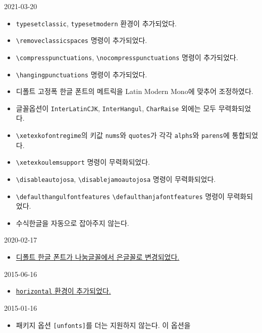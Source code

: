 \documentclass[a4paper]{article}
\def\cs#1{\texttt{\textbackslash #1}}
\begin{document}
\begin{small}\linespread{1.2}\selectfont
\begin{description}\itemsep=0pt
    \item[v3.0] 2021-03-20
      \begin{itemize}
        \item \verb|typesetclassic|, \verb|typesetmodern| 환경이 추가되었다.
        \item \cs{removeclassicspaces} 명령이 추가되었다.
        \item \cs{compresspunctuations}, \cs{nocompresspunctuations} 명령이 추가되었다.
        \item \cs{hangingpunctuations} 명령이 추가되었다.
        \item 디폴트 고정폭 한글 폰트의 메트릭을 Latin Modern Mono에
          맞추어 조정하였다.
        \item 글꼴옵션이 \verb|InterLatinCJK|, \verb|InterHangul|, \verb|CharRaise|
          외에는 모두 무력화되었다.
        \item \cs{xetexkofontregime}의 키값 \verb|nums|와 \verb|quotes|가
          각각 \verb|alphs|와 \verb|parens|에 통합되었다.
        \item \cs{xetexkoulemsupport} 명령이 무력화되었다.
        \item \cs{disableautojosa}, \cs{disablejamoautojosa} 명령이 무력화되었다.
        \item \cs{defaulthangulfontfeatures} \cs{defaulthanjafontfeatures}
          명령이 무력화되었다.
        \item 수식한글을 자동으로 잡아주지 않는다.
      \end{itemize}
    \item[v2.23] 2020-02-17
      \begin{itemize}
        \item \hyperref[sec:fontcmds]
          {디폴트 한글 폰트가 나눔글꼴에서 은글꼴로 변경되었다.}
      \end{itemize}
    \item[v2.13] 2015-06-16
      \begin{itemize}
        \item \hyperref[sec:verttype]
          {\texttt{horizontal} 환경이 추가되었다.}
      \end{itemize}
    \item[v2.10] 2015-01-16
      \begin{itemize}
        \item 패키지 옵션 \texttt{[unfonts]}를 더는 지원하지 않는다. 이 옵션을

\end{itemize}
\end{description}
\end{small}
\end{document}
